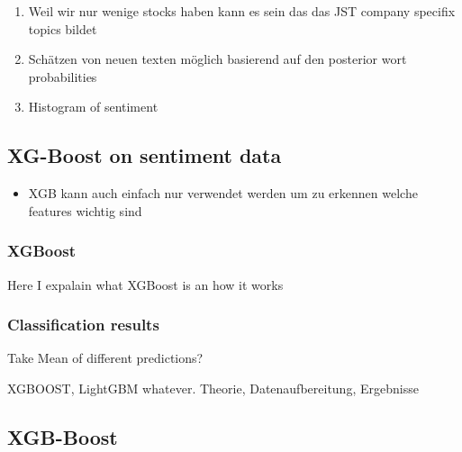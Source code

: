 \begin{enumerate}
    \item Weil wir nur wenige stocks haben kann es sein das das JST company specifix topics bildet
    \item Schätzen von neuen texten möglich basierend auf den posterior wort probabilities
    \item Histogram of sentiment
\end{enumerate}




\subsection{XG-Boost on sentiment data}
\begin{itemize}
    \item XGB kann auch einfach nur verwendet werden um zu erkennen welche features wichtig sind
\end{itemize}
\subsubsection{XGBoost}
Here I expalain what XGBoost is an how it works

\subsubsection{Classification results}
Take Mean of different predictions?

XGBOOST, LightGBM whatever. 
Theorie, Datenaufbereitung, Ergebnisse




\subsection{XGB-Boost}

